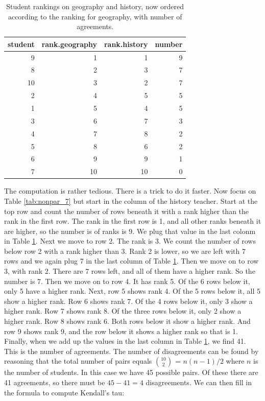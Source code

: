 \documentclass[]{book}\usepackage[]{graphicx}\usepackage[]{color}
\begin{document}
\begin{table}[ht]
\centering
\caption{Student rankings on geography and history, now ordered according to the ranking for geography, with number of agreements.} 
\label{tab:nonpar_8}
\begin{tabular}{rrrr}
  \hline
student & rank.geography & rank.history & number \\ 
  \hline
9 & 1 & 1 & 9 \\ 
  8 & 2 & 3 & 7 \\ 
  10 & 3 & 2 & 7 \\ 
  2 & 4 & 5 & 5 \\ 
  1 & 5 & 4 & 5 \\ 
  3 & 6 & 7 & 3 \\ 
  4 & 7 & 8 & 2 \\ 
  5 & 8 & 6 & 2 \\ 
  6 & 9 & 9 & 1 \\ 
  7 & 10 & 10 & 0 \\ 
   \hline
\end{tabular}
\end{table}


The computation is rather tedious. There is a trick to do it faster. Now focus on Table \ref{tab:nonpar_7} but start in the column of the history teacher. Start at the top row and count the number of rows beneath it with a rank higher than the rank in the first row. The rank in the first row is 1, and all other ranks beneath it are higher, so the number is of ranks is 9. We plug that value in the last colonm in Table \ref{tab:nonpar_8}. Next we move to row 2. The rank is 3. We count the number of rows below row 2 with a rank higher than 3. Rank 2 is lower, so we are left with 7 rows and we again plug 7 in the last column of Table \ref{tab:nonpar_8}. Then we move on to row 3, with rank 2. There are 7 rows left, and all of them have a higher rank. So the number is 7. Then we move on to row 4. It has rank 5. Of the 6 rows below it, only 5 have a higher rank. Next, row 5 shows rank 4. Of the 5 rows below it, all 5 show a higher rank. Row 6 shows rank 7. Of the 4 rows below it, only 3 show a higher rank. Row 7 shows rank 8. Of the three rows below it, only 2 show a higher rank. Row 8 shows rank 6. Both rows below it show a higher rank. And row 9 shows rank 9, and the row below it shows a higher rank so that is 1. Finally, when we add up the values in the last column in Table \ref{tab:nonpar_8}, we find 41. This is the number of agreements. The number of disagreements can be found by reasoning that the total number of pairs equals $10 \choose 2 $ = $n(n-1)/2$ where $n$ is the number of students. In this case we have 45 possible pairs. Of these there are 41 agreements, so there must be $45-41=4$ disagreements. We can then fill in the formula to compute Kendall's tau:
\end{document}
